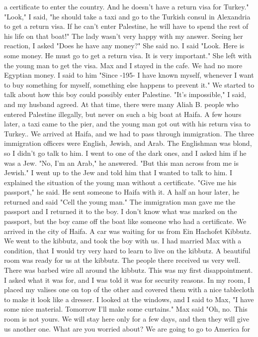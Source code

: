 a certificate to enter the country. And he doesn't have a return visa for Turkey." 
"Look," I said, "he should take a taxi and go to the Turkish consul in Alexandria to 
get a return visa. If he can't enter Palestine, he will have to spend the rest of his life 
on that boat!" 
The lady wasn't very happy with my answer. Seeing her reaction, I asked "Does he have  
any money?" She said no. I said "Look. Here is some money. He must go to get a return visa. It is very important." She left with the young man to get the visa.
Max and I stayed in the cafe. We had no more Egyptian money. I said to him "Since 
-195- 
I have known myself, whenever I want to buy something for myself, something else happens to prevent it." We started to talk about how this boy could possibly enter Palestine. "It's impossible," I said, and my husband agreed. At that time, there were 
many Aliah B. people who entered Palestine illegally, but never on such a big boat 
at Haifa. A few hours later, a taxi came to the pier, and the young man got out with 
his return visa to Turkey.. 
We arrived at Haifa, and we had to pass through immigration. The three immigration officers were English, Jewish, and Arab. The Englishman was blond, so I didn't 
go talk to him. I went to one of the dark ones, and I asked him if he was a Jew. 
"No, I'm an Arab," he answered. "But this man across from me is Jewish." 
I went up to the Jew and told him that I wanted to talk to him. I explained the 
situation of the young man without a certificate. 
"Give me his passport," he said. He sent someone to Haifa with it. A half an 
hour later, he returned and said "Cell the young man." The immigration man gave me 
the passport and I returned it to the boy. I don't know what was marked on the passport, but the boy came off the boat like someone who had a certificate. 
We arrived in the city of Haifa. A car was waiting for us from Ein Hachofet 
Kibbutz. We went to the kibbutz, and took the boy with us. I 
had married Max with a condition, that I would try very hard to learn to live on the 
kibbutz. A beautiful room was ready for us at the kibbutz. The people there 
received us very well. There was barbed wire all around the kibbutz. 
This was my first disappointment. I asked what it was for, and I was 
told it was for security reasons. 
In my room, I placed my valises one on top of the other and covered 
them with a nice tablecloth to make it look like a dresser. I looked at 
the windows, and I said to Max, "I have some nice material. Tomorrow 
I'll make some curtains." Max said "Oh, no. This room is not yours. 
We will stay here only for a few days, and then they will give us another one. What are you worried about? We are going to go to America for 
